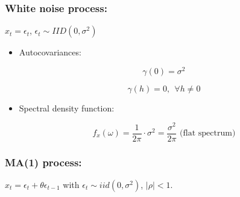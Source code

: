 
\subsubsection{White noise process:}  \(x_t = \epsilon_t\), \(\epsilon_t \sim IID(0, \sigma^2)\)

\begin{itemize}

\item Autocovariances: 

\[
\gamma(0) = \sigma^2
\]

\[
\gamma(h) =0, \ \ \forall h \neq 0
\]

\item Spectral density function:

\[
f_x(\omega) = \frac{1}{2\pi} \cdot \sigma^2 = \frac{\sigma^2}{2 \pi} \text{ (flat spectrum)}
\]

\end{itemize}


\subsubsection{MA(1) process:} \(x_t = \epsilon_t + \theta \epsilon_{t-1}\) with \(\epsilon_t \sim iid(0, \sigma^2)\), \(|\rho| < 1\). 

